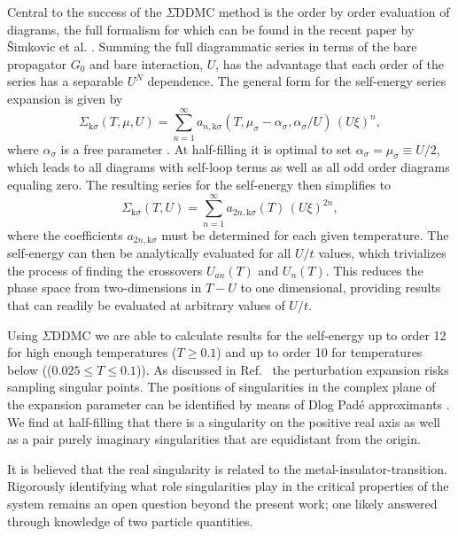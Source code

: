 \documentclass[twocolumn,notitlepage,prl,superscriptaddress,showpacs]{revtex4-1}
\begin{document}
 Central to the success of the $\Sigma$DDMC method is the order by order evaluation of diagrams, the full formalism for which can be found in the recent paper by \v{S}imkovic et al. . Summing the full diagrammatic series in terms of the bare propagator $G_0$ and bare interaction, $U$, has the advantage that each order of the series has a separable $U^N$ dependence. The general form for the self-energy series expansion is given by 
\begin{equation}
\Sigma_{\mathrm{k} \sigma}(T,\mu, U) = \sum_{n=1}^{\infty} a_{n, \mathrm{k}\sigma}(T,\mu_{\sigma}-\alpha_{\sigma},\alpha_{\sigma}/U) \, \left(U \xi\right)^{n} , \label{eqn:Sigma_series_gen}
\end{equation}
where $\alpha_{\sigma}$ is a free parameter \cite{rubtsov2005continuous}. At half-filling it is optimal to set $\alpha_{\sigma} =\mu_{\sigma} \equiv U/2$, which leads to all diagrams with self-loop terms as well as all odd order diagrams equaling zero. The resulting series for the self-energy then simplifies to
 \begin{equation}
\Sigma_{\mathrm{k} \sigma}(T, U) = \sum_{n=1}^{\infty} a_{2n, \mathrm{k}\sigma}(T) \, \left(U \xi\right)^{2n}, \label{eqn:Sigma_series}
\end{equation}
 where the coefficients $a_{2n, \mathrm{k}\sigma}$ must be determined for each given temperature. The self-energy can then be analytically evaluated for all $U/t$ values, which trivializes the process of finding the crossovers $U_{an}(T)$ and $U_n(T)$. This reduces the phase space from two-dimensions in $T-U$ to one dimensional, providing results that can readily be evaluated at arbitrary values of $U/t$. 
 
 Using $\Sigma$DDMC we are able to calculate results for the self-energy up to order 12 for high enough temperatures ($T\geq 0.1$) and up to order 10 for temperatures below (($0.025 \leq T\leq 0.1$)). 
 As discussed in Ref.~\cite{simkovic2017determinant} the perturbation expansion risks sampling singular points.  The positions of singularities in the complex plane of the expansion parameter can be identified by means of Dlog Pad\'{e} approximants \cite{baker1961application}. We find at half-filling that there is a singularity on the positive real axis as well as a pair purely imaginary singularities that are equidistant from the origin.
 
 It is believed that the real singularity is related to the metal-insulator-transition. Rigorously identifying what role singularities play in the critical properties of the system remains an open question beyond the present work; one likely answered through knowledge of two particle quantities.\cite{gunnarsson:2015,wu:2017,gunnarsson:2018}
 
\end{document}
